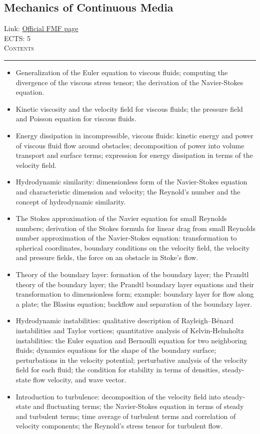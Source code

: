 \documentclass[11pt, a4paper]{article}
\newenvironment{course}[3]{
\subsection{#1}%
Link: \href{#2}{Official FMF page}\\%
ECTS: #3%
\vspace{1ex}
\\
{\large \textsc{Contents}}\\[-0.9ex]%
\rule{\textwidth}{0.5pt}
\vspace{-3ex}
}
{}
\newenvironment{chapter}[1]{
\begin{tcolorbox}[title=#1, breakable]
}
{\end{tcolorbox}}
\begin{document}
\begin{course}{Mechanics of Continuous Media}{https://www.fmf.uni-lj.si/en/study-physics/programmes/1fiz/2020/7000777/courses/1160/}{5}
\begin{chapter}{Mechanics of viscous fluids}
\begin{itemize}
            \item Generalization of the Euler equation to viscous fluids; computing the divergence of the viscous stress tensor; the derivation of the Navier-Stokes equation.

            \item Kinetic viscosity and the velocity field for viscous fluids; the pressure field and Poisson equation for viscous fluids.

            \item Energy dissipation in incompressible, viscous fluids: kinetic energy and power of viscous fluid flow around obstacles; decomposition of power into volume transport and surface terms; expression for energy dissipation in terms of the velocity field.

            \item Hydrodynamic similarity: dimensionless form of the Navier-Stokes equation and characteristic dimension and velocity; the Reynold's number and the concept of hydrodynamic similarity.

            \item The Stokes approximation of the Navier equation for small Reynolds numbers; derivation of the Stokes formula for linear drag from small Reynolds number approximation of the Navier-Stokes equation: transformation to spherical coordinates, boundary conditions on the velocity field, the velocity and pressure fields, the force on an obstacle in Stoke's flow.

            \item Theory of the boundary layer: formation of the boundary layer; the Prandtl theory of the boundary layer; the Prandtl boundary layer equations and their transformation to dimensionless form; example: boundary layer for flow along a plate; the Blasius equation; backflow and separation of the boundary layer.

            \item Hydrodynamic instabilities: qualitative description of Rayleigh–Bénard instabilities and Taylor vortices; quantitative analysis of Kelvin-Helmholtz instabilities: the Euler equation and Bernoulli equation for two neighboring fluids; dynamics equations for the shape of the boundary surface; perturbations in the velocity potential; perturbative analysis of the velocity field for each fluid; the condition for stability in terms of densities, steady-state flow velocity, and wave vector.

            \item Introduction to turbulence: decomposition of the velocity field into steady-state and fluctuating terms; the Navier-Stokes equation in terms of steady and turbulent terms; time average of turbulent terms and correlation of velocity components; the Reynold's stress tensor for turbulent flow.
        \end{itemize}
    \end{chapter}
\end{course}
\end{document}
